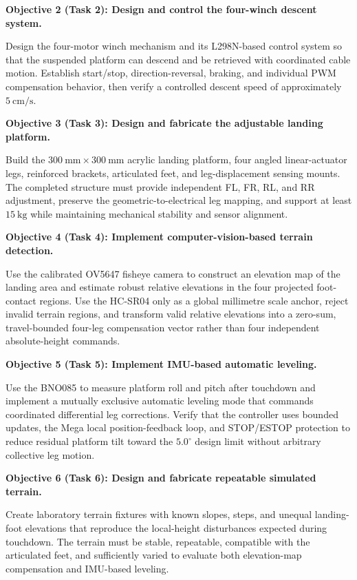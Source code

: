 \documentclass{engr1000j-s2}
\begin{document}
\textbf{Objective 2 (Task 2): Design and control the four-winch descent system.}

Design the four-motor winch mechanism and its L298N-based control system so that the suspended platform can descend and be retrieved with coordinated cable motion. Establish start/stop, direction-reversal, braking, and individual PWM compensation behavior, then verify a controlled descent speed of approximately $5~\mathrm{cm/s}$.

\textbf{Objective 3 (Task 3): Design and fabricate the adjustable landing platform.}

Build the $300~\mathrm{mm}\times300~\mathrm{mm}$ acrylic landing platform, four angled linear-actuator legs, reinforced brackets, articulated feet, and leg-displacement sensing mounts. The completed structure must provide independent FL, FR, RL, and RR adjustment, preserve the geometric-to-electrical leg mapping, and support at least $15~\mathrm{kg}$ while maintaining mechanical stability and sensor alignment.

\textbf{Objective 4 (Task 4): Implement computer-vision-based terrain detection.}

Use the calibrated OV5647 fisheye camera to construct an elevation map of the landing area and estimate robust relative elevations in the four projected foot-contact regions. Use the HC-SR04 only as a global millimetre scale anchor, reject invalid terrain regions, and transform valid relative elevations into a zero-sum, travel-bounded four-leg compensation vector rather than four independent absolute-height commands.

\textbf{Objective 5 (Task 5): Implement IMU-based automatic leveling.}

Use the BNO085 to measure platform roll and pitch after touchdown and implement a mutually exclusive automatic leveling mode that commands coordinated differential leg corrections. Verify that the controller uses bounded updates, the Mega local position-feedback loop, and STOP/ESTOP protection to reduce residual platform tilt toward the $5.0^\circ$ design limit without arbitrary collective leg motion.

\textbf{Objective 6 (Task 6): Design and fabricate repeatable simulated terrain.}

Create laboratory terrain fixtures with known slopes, steps, and unequal landing-foot elevations that reproduce the local-height disturbances expected during touchdown. The terrain must be stable, repeatable, compatible with the articulated feet, and sufficiently varied to evaluate both elevation-map compensation and IMU-based leveling.
\end{document}
